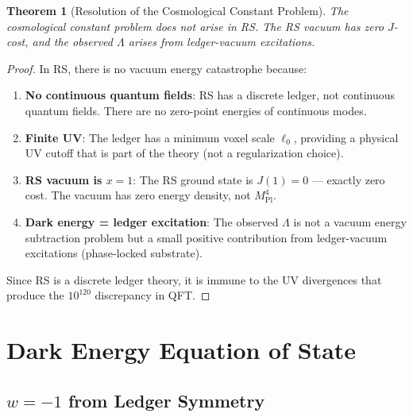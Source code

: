 \documentclass[12pt,a4paper]{article}
\newtheorem{theorem}{Theorem}[section]
\theoremstyle{definition}
\theoremstyle{remark}
\begin{document}
\begin{theorem}[Resolution of the Cosmological Constant Problem]\label{thm:cc-resolution}
The cosmological constant problem does not arise in RS. The RS vacuum has zero $J$-cost, and the observed $\Lambda$ arises from ledger-vacuum excitations.
\end{theorem}
\begin{proof}
In RS, there is no vacuum energy catastrophe because:
\begin{enumerate}
\item \textbf{No continuous quantum fields}: RS has a discrete ledger, not continuous 
quantum fields. There are no zero-point energies of continuous modes.

\item \textbf{Finite UV}: The ledger has a minimum voxel scale $\ell_0$, providing a 
physical UV cutoff that is part of the theory (not a regularization choice).

\item \textbf{RS vacuum is $x = 1$}: The RS ground state is $J(1) = 0$ — exactly zero 
cost. The vacuum has zero energy density, not $M_\mathrm{Pl}^4$.

\item \textbf{Dark energy = ledger excitation}: The observed $\Lambda$ is not a 
vacuum energy subtraction problem but a small positive contribution from 
ledger-vacuum excitations (phase-locked substrate).
\end{enumerate}
Since RS is a discrete ledger theory, it is immune to the UV divergences that produce the $10^{120}$ discrepancy in QFT.
\end{proof}

\section{Dark Energy Equation of State}

\subsection{$w = -1$ from Ledger Symmetry}
\end{document}
